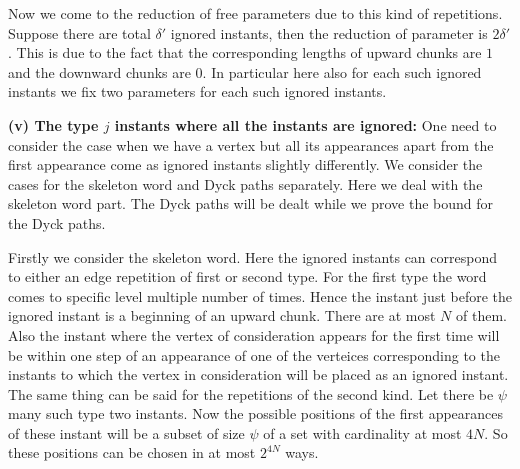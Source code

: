 \documentclass[12pt]{article}
\numberwithin{equation}{section}
\numberwithin{equation}{section}
\theoremstyle{definition}
\renewcommand{\1}{\bf 1}
\begin{document}
Now we come to the reduction of free parameters due to this kind of repetitions. Suppose there are total $\delta'$ ignored instants, then the reduction of parameter is $2\delta'$. This is due to the fact that the corresponding lengths of upward chunks are $1$ and the downward chunks are $0$. In particular here also for each such ignored instants we fix two parameters for each such ignored instants.

\noindent 
\textbf{(v) The type $j$ instants where all the instants are ignored:} One need to consider the case when we have a vertex but all its appearances apart from the first appearance come as ignored instants slightly differently. We consider the cases for the skeleton word and Dyck paths separately. Here we deal with the skeleton word part. The Dyck paths will be dealt while we prove the bound for the Dyck paths.

 Firstly we consider the skeleton word. Here the ignored instants can correspond to either an edge repetition of first or second type. For the first type the word comes to specific level multiple number of times. Hence the instant just before the ignored instant is a beginning of an upward chunk. There are at most $N$ of them. Also the instant where the vertex of consideration appears for the first time will be within one step of an appearance of one of the verteices corresponding to the instants to which the vertex in consideration will be placed as an ignored instant. The same thing can be said for the repetitions of the second kind. Let there be $\psi$ many such type two instants. Now the possible positions of the first appearances of these instant will be a subset of size $\psi$ of a set with cardinality at most $4N$. So these positions can be chosen in at most $2^{4N}$ ways.
 
\end{document}
